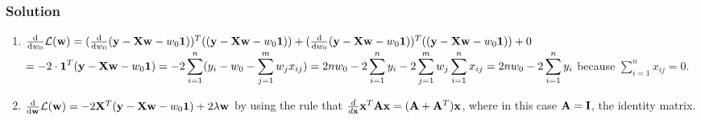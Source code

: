 \documentclass[submit]{harvardml}
\begin{document}
	\subsubsection*{Solution}
	\begin{enumerate}
		\item $\frac{\textup{d}}{\textup{d}w_0}\mathcal{L}(\mathbf{w})=(\frac{\textup{d}}{\textup{d}w_0}(\mathbf{y}-\mathbf{X}\mathbf{w}-w_0\textbf{1}))^T((\mathbf{y}-\mathbf{X}\mathbf{w}-w_0\textbf{1}))+(\frac{\textup{d}}{\textup{d}w_0}(\mathbf{y}-\mathbf{X}\mathbf{w}-w_0\textbf{1}))^T((\mathbf{y}-\mathbf{X}\mathbf{w}-w_0\textbf{1}))+0$ \\
		$= -2\cdot \textbf{1}^T(\mathbf{y}-\mathbf{X}\mathbf{w}-w_0\textbf{1}) \\
		 = -2\displaystyle\sum_{i=1}^{n}(y_i-w_0-\displaystyle\sum_{j=1}^{m}w_jx_{ij}) \\
		 = 2nw_0 -2\displaystyle\sum_{i=1}^{n}y_i -2 \displaystyle\sum_{j=1}^{m}w_j\displaystyle\sum_{i=1}^{n}x_{ij} \\
		 = 2nw_0 -2\displaystyle\sum_{i=1}^{n}y_i$ because $\displaystyle\sum_{i=1}^{n}x_{ij} = 0$.  
		 
		 \item 
		 $\frac{\textup{d}}{\textup{d}\mathbf{w}}\mathcal{L}(\mathbf{w}) = -2\mathbf{X}^T(\mathbf{y}-\mathbf{X}\mathbf{w}-w_0\textbf{1})  + 2\lambda\mathbf{w}$ by using the rule that $\frac{d}{d\mathbf{x}}\mathbf{x}^T\mathbf{A}\mathbf{x} = (\mathbf{A} + \mathbf{A}^T)\mathbf{x}$, where in this case $\mathbf{A} = \mathbf{I}$, the identity matrix.
		 

\end{enumerate}
\end{document}
